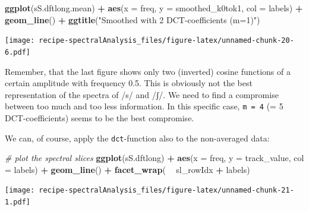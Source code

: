 \documentclass[]{book}
\newenvironment{Shaded}{\begin{snugshade}}{\end{snugshade}}
\newcommand{\CommentTok}[1]{\textcolor[rgb]{0.56,0.35,0.01}{\textit{#1}}}
\newcommand{\DataTypeTok}[1]{\textcolor[rgb]{0.13,0.29,0.53}{#1}}
\newcommand{\KeywordTok}[1]{\textcolor[rgb]{0.13,0.29,0.53}{\textbf{#1}}}
\newcommand{\NormalTok}[1]{#1}
\newcommand{\OperatorTok}[1]{\textcolor[rgb]{0.81,0.36,0.00}{\textbf{#1}}}
\newcommand{\StringTok}[1]{\textcolor[rgb]{0.31,0.60,0.02}{#1}}
\begin{document}
\begin{Shaded}
\begin{Highlighting}[]
\KeywordTok{ggplot}\NormalTok{(sS.dftlong.mean) }\OperatorTok{+}
\StringTok{  }\KeywordTok{aes}\NormalTok{(}\DataTypeTok{x =}\NormalTok{ freq, }\DataTypeTok{y =}\NormalTok{ smoothed_k0tok1, }\DataTypeTok{col =}\NormalTok{ labels) }\OperatorTok{+}
\StringTok{  }\KeywordTok{geom_line}\NormalTok{() }\OperatorTok{+}
\StringTok{  }\KeywordTok{ggtitle}\NormalTok{(}\StringTok{"Smoothed with 2 DCT-coefficients (m=1)"}\NormalTok{)}
\end{Highlighting}
\end{Shaded}

\texttt{[image: recipe-spectralAnalysis\_files/figure-latex/unnamed-chunk-20-6.pdf]}

Remember, that the last figure shows only two (inverted) cosine functions of a certain amplitude with frequency 0.5. This is obviously not the best representation of the spectra of /s/ and /ʃ/. We need to find a compromise between too much and too less information. In this specific case, \texttt{m\ =\ 4} (= 5 DCT-coefficients) seems to be the best compromise.

We can, of course, apply the \texttt{dct}-function also to the non-averaged data:

\begin{Shaded}
\begin{Highlighting}[]
\CommentTok{# plot the spectral slices}
\KeywordTok{ggplot}\NormalTok{(sS.dftlong) }\OperatorTok{+}
\StringTok{  }\KeywordTok{aes}\NormalTok{(}\DataTypeTok{x =}\NormalTok{ freq, }\DataTypeTok{y =}\NormalTok{ track_value, }\DataTypeTok{col =}\NormalTok{ labels) }\OperatorTok{+}
\StringTok{  }\KeywordTok{geom_line}\NormalTok{() }\OperatorTok{+}
\StringTok{  }\KeywordTok{facet_wrap}\NormalTok{( }\OperatorTok{~}\StringTok{ }\NormalTok{sl_rowIdx }\OperatorTok{+}\StringTok{ }\NormalTok{labels)}
\end{Highlighting}
\end{Shaded}

\texttt{[image: recipe-spectralAnalysis\_files/figure-latex/unnamed-chunk-21-1.pdf]}
\end{document}
